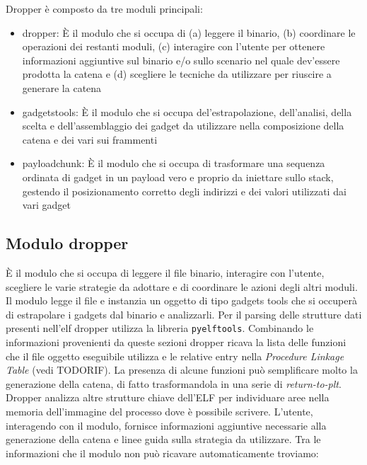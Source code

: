 Dropper è composto da tre moduli principali:

\begin{itemize}

  \item dropper: È il modulo che si occupa di (a) leggere il binario,
    (b) coordinare le operazioni dei restanti moduli, (c) interagire
    con l'utente per ottenere informazioni aggiuntive sul binario e/o
    sullo scenario nel quale dev'essere prodotta la catena e (d)
    scegliere le tecniche da utilizzare per riuscire a generare la
    catena

  \item gadgetstools: È il modulo che si occupa del'estrapolazione,
    dell'analisi, della scelta e dell'assemblaggio dei gadget da utilizzare nella
    composizione della catena e dei vari sui frammenti

  \item payloadchunk: È il modulo che si occupa di trasformare una
    sequenza ordinata di gadget in un payload vero e proprio da
    iniettare sullo stack, gestendo il posizionamento corretto degli
    indirizzi e dei valori utilizzati dai vari gadget

\end{itemize}

\subsection{Modulo dropper}

È il modulo che si occupa di leggere il file binario, interagire con
l'utente, scegliere le varie strategie da adottare e di coordinare le
azioni degli altri moduli. Il modulo legge il file e instanzia un
oggetto di tipo gadgets tools che si occuperà di estrapolare i gadgets
dal binario e analizzarli. Per il parsing delle strutture dati
presenti nell'elf dropper utilizza la libreria
\lstinline{pyelftools}\cite{pyelftools}. Combinando le informazioni
provenienti da queste sezioni dropper ricava la lista delle funzioni
che il file oggetto eseguibile utilizza e le relative entry nella
\emph{Procedure Linkage Table} (vedi TODORIF). La presenza di alcune
funzioni può semplificare molto la generazione della catena, di fatto
trasformandola in una serie di \emph{return-to-plt}. Dropper analizza
altre strutture chiave dell'ELF per individuare aree nella memoria
dell'immagine del processo dove è possibile scrivere. L'utente,
interagendo con il modulo, fornisce informazioni aggiuntive necessarie
alla generazione della catena e linee guida sulla strategia da
utilizzare. Tra le informazioni che il modulo non può ricavare
automaticamente troviamo:

